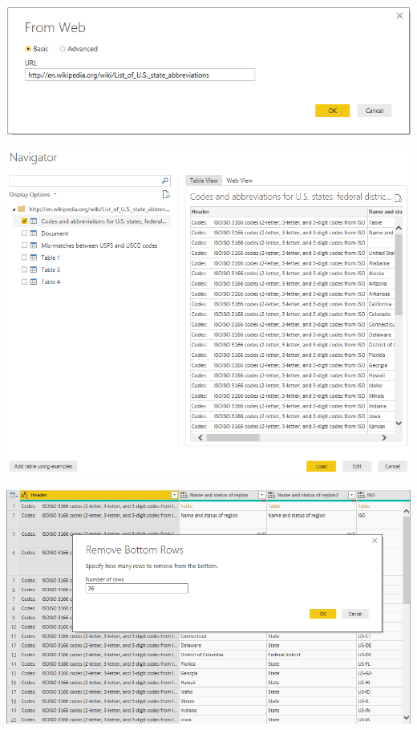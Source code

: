 	\begin{center}
	\includegraphics[width=15cm]{./images/power15}
	\end{center}	

	\begin{center}
	\includegraphics[width=15cm]{./images/power16}
	\end{center}	

	\begin{center}
	\includegraphics[width=15cm]{./images/power17}
	\end{center}	

